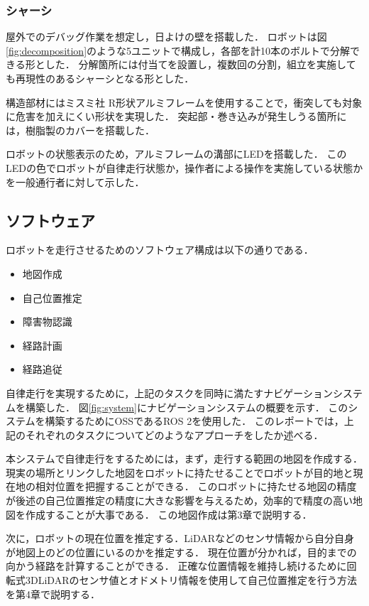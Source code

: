 \subsubsection{シャーシ}
屋外でのデバッグ作業を想定し，日よけの壁を搭載した．
ロボットは図\ref{fig:decomposition}のような5ユニットで構成し，各部を計10本のボルトで分解できる形とした．
分解箇所には付当てを設置し，複数回の分割，組立を実施しても再現性のあるシャーシとなる形とした．

構造部材にはミスミ社 R形状アルミフレーム\cite{MISUMI}を使用することで，衝突しても対象に危害を加えにくい形状を実現した．
突起部・巻き込みが発生しうる箇所には，樹脂製のカバーを搭載した．

ロボットの状態表示のため，アルミフレームの溝部にLEDを搭載した．
このLEDの色でロボットが自律走行状態か，操作者による操作を実施している状態かを一般通行者に対して示した．



\subsection{ソフトウェア}
ロボットを走行させるためのソフトウェア構成は以下の通りである．
\begin{itemize}
    \item 地図作成
    \item 自己位置推定
    \item 障害物認識
    \item 経路計画
    \item 経路追従
\end{itemize}

自律走行を実現するために，上記のタスクを同時に満たすナビゲーションシステムを構築した．
図\ref{fig:system}にナビゲーションシステムの概要を示す．
このシステムを構築するためにOSSであるROS 2\cite{ROS2}を使用した．
このレポートでは，上記のそれぞれのタスクについてどのようなアプローチをしたか述べる．

本システムで自律走行をするためには，まず，走行する範囲の地図を作成する．
現実の場所とリンクした地図をロボットに持たせることでロボットが目的地と現在地の相対位置を把握することができる．
このロボットに持たせる地図の精度が後述の自己位置推定の精度に大きな影響を与えるため，効率的で精度の高い地図を作成することが大事である．
この地図作成は第3章で説明する．

次に，ロボットの現在位置を推定する．LiDARなどのセンサ情報から自分自身が地図上のどの位置にいるのかを推定する．
現在位置が分かれば，目的までの向かう経路を計算することができる．
正確な位置情報を維持し続けるために回転式3DLiDARのセンサ値とオドメトリ情報を使用して自己位置推定を行う方法を第4章で説明する．

